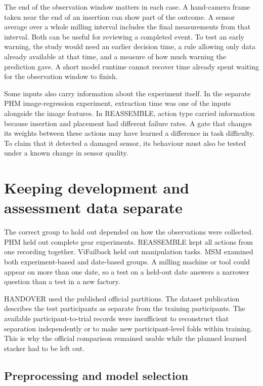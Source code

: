 The end of the observation window matters in each case. A hand-camera frame taken near
the end of an insertion can show part of the outcome. A sensor average over a whole
milling interval includes the final measurements from that interval. Both can be useful
for reviewing a completed event. To test an early warning, the study would need an
earlier decision time, a rule allowing only data already available at that time, and a
measure of how much warning the prediction gave. A short model runtime cannot recover
time already spent waiting for the observation window to finish.

Some inputs also carry information about the experiment itself. In the separate PHM
image-regression experiment, extraction time was one of the inputs alongside the image
features. In REASSEMBLE, action type carried information because insertion and placement
had different failure rates. A gate that changes its weights between these actions may
have learned a difference in task difficulty. To claim that it detected a damaged
sensor, its behaviour must also be tested under a known change in sensor quality.

\section{Keeping development and assessment data separate}
\label{sec:ch4-assessment}

The correct group to hold out depended on how the observations were collected. PHM held
out complete gear experiments. REASSEMBLE kept all actions from one recording together.
ViFailback held out manipulation tasks. MSM examined both experiment-based and
date-based groups. A milling machine or tool could appear on more than one date, so a
test on a held-out date answers a narrower question than a test in a new factory.

HANDOVER used the published official partitions. The dataset publication describes the
test participants as separate from the training participants. The available
participant-to-trial records were insufficient to reconstruct that separation
independently or to make new participant-level folds within training. This is why the
official comparison remained usable while the planned learned stacker had to be left
out.

\subsection{Preprocessing and model selection}

